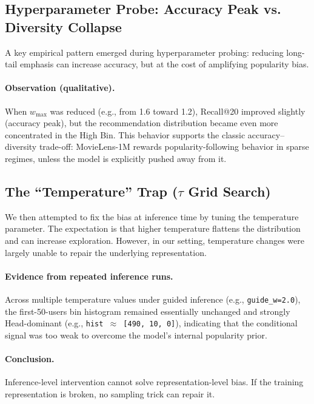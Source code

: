 \documentclass[11pt,a4paper]{article}
\begin{document}
\subsection{Hyperparameter Probe: Accuracy Peak vs. Diversity Collapse}
A key empirical pattern emerged during hyperparameter probing: reducing long-tail emphasis can increase accuracy, but at the cost of amplifying popularity bias.

\paragraph{Observation (qualitative).}
When $w_{\max}$ was reduced (e.g., from 1.6 toward 1.2), Recall@20 improved slightly (accuracy peak), but the recommendation distribution became even more concentrated in the High Bin. This behavior supports the classic accuracy--diversity trade-off: MovieLens-1M rewards popularity-following behavior in sparse regimes, unless the model is explicitly pushed away from it.

\subsection{The ``Temperature'' Trap ($\tau$ Grid Search)}
We then attempted to fix the bias at inference time by tuning the temperature parameter. The expectation is that higher temperature flattens the distribution and can increase exploration. However, in our setting, temperature changes were largely unable to repair the underlying representation.

\paragraph{Evidence from repeated inference runs.}
Across multiple temperature values under guided inference (e.g., \texttt{guide\_w=2.0}), the first-50-users bin histogram remained essentially unchanged and strongly Head-dominant (e.g., \texttt{hist $\approx$ [490, 10, 0]}), indicating that the conditional signal was too weak to overcome the model’s internal popularity prior.

\paragraph{Conclusion.}
Inference-level intervention cannot solve representation-level bias. If the training representation is broken, no sampling trick can repair it.

\end{document}
